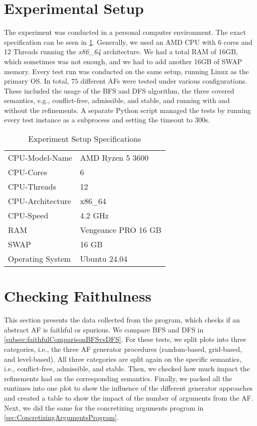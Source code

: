 \section{Experimental Setup}
\label{sec:Setup}
The experiment was conducted in a personal computer environment. The exact specification can be seen in \cref{table:ExperimentSpecs}. Generally, we used an AMD CPU with 6 cores and 12 Threads running the \textit{x86\_64} architecture. We had a total RAM of 16GB, which sometimes was not enough, and we had to add another 16GB of SWAP memory. Every test run was conducted on the same setup, running Linux as the primary OS. In total, $75$ different AFs were tested under various configurations. These included the usage of the BFS and DFS algorithm, the three covered semantics, e.g., conflict-free, admissible, and stable, and running with and without the refinements. A separate Python script managed the tests by running every test instance as a subprocess and setting the timeout to 300s.

\begin{table}[H]
    \centering
    \caption{Experiment Setup Specifications}
    \begin{tabular}{ |l|l| }
    \hline
        CPU-Model-Name & AMD Ryzen 5 3600\\
        CPU-Cores & 6\\
        CPU-Threads & 12\\
        CPU-Architecture & x86\_64\\
        CPU-Speed & 4.2 GHz\\
        RAM & Vengeance PRO 16 GB\\
        SWAP & 16 GB\\
        Operating System & Ubuntu 24.04 \\
    \hline
    \end{tabular}
\label{table:ExperimentSpecs}
\end{table}





\section{Checking Faithulness}
\label{sec:FaithfulSpuriusCheck}

This section presents the data collected from the program, which checks if an abstract AF is faithful or spurious. We compare BFS and DFS in \cref{subsec:faithfulComparisonBFSvsDFS}. For these tests, we split plots into three categories, i.e., the three AF generator procedures (random-based, grid-based, and level-based). All three categories are split again on the specific semantics, i.e., conflict-free, admissible, and stable. Then, we checked how much impact the refinements had on the corresponding semantics. Finally, we packed all the runtimes into one plot to show the influence of the different generator approaches and created a table to show the impact of the number of arguments from the AF. Next, we did the same for the concretizing arguments program in \cref{sec:ConcretizingArgumentsProgram}.

